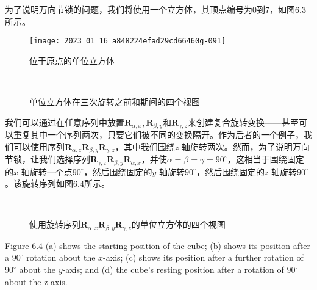 为了说明万向节锁的问题，我们将使用一个立方体，其顶点编号为0到7，如图6.3所示。
\begin{figure}[h!]
    \centering
    \texttt{[image: 2023\_01\_16\_a848224efad29cd66460g-091]}
    \caption[short]{位于原点的单位立方体}
\end{figure}
\begin{figure}[h!]
    \centering
    \\
    \caption[short]{单位立方体在三次旋转之前和期间的四个视图}
\end{figure}

我们可以通过在任意序列中放置$\mathbf{R}_{\alpha, x}, \mathbf{R}_{\beta, y}$和$\mathbf{R}_{\gamma, z}$来创建复合旋转变换——甚至可以重复其中一个序列两次，只要它们被不同的变换隔开。作为后者的一个例子，我们可以使用序列$\mathbf{R}_{\alpha, z} \mathbf{R}_{\beta, y} \mathbf{R}_{\gamma, z}$，其中我们围绕$z$-轴旋转两次。然而，为了说明万向节锁，让我们选择序列$\mathbf{R}_{\gamma, z} \mathbf{R}_{\beta, y} \mathbf{R}_{\alpha, x}$，并使$\alpha=\beta=\gamma=90^{\circ}$，这相当于围绕固定的$x$-轴旋转一个点$90^{\circ}$，然后围绕固定的$y$-轴旋转$90^{\circ}$，然后围绕固定的$z$-轴旋转$90^{\circ}$。该旋转序列如图6.4所示。

\begin{figure}[h!]
    \centering
    \\
    \caption[short]{使用旋转序列$\mathbf{R}_{\alpha, x} \mathbf{R}_{\beta, y} \mathbf{R}_{\gamma, z}$的单位立方体的四个视图}
\end{figure}


Figure $6.4$ (a) shows the starting position of the cube; (b) shows its position after a $90^{\circ}$ rotation about the $x$-axis; (c) shows its position after a further rotation of $90^{\circ}$ about the $y$-axis; and (d) the cube's resting position after a rotation of $90^{\circ}$ about the z-axis.

